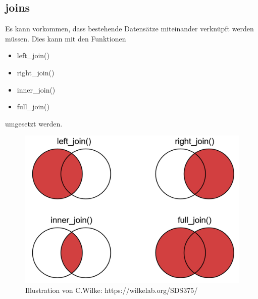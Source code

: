 \documentclass[
]{article}
\providecommand{\tightlist}{%
  \setlength{\itemsep}{0pt}\setlength{\parskip}{0pt}}
\begin{document}
\hypertarget{joins}{%
\subsection{joins}\label{joins}}

Es kann vorkommen, dass bestehende Datensätze miteinander verknüpft werden müssen. Dies kann mit den Funktionen

\begin{itemize}
\tightlist
\item
  left\_join()
\item
  right\_join()
\item
  inner\_join()
\item
  full\_join()
\end{itemize}

umgesetzt werden.

\begin{figure}

{\centering \includegraphics[width=1\linewidth]{images/044} 

}

\caption{Illustration von C.Wilke: https://wilkelab.org/SDS375/}\label{fig:unnamed-chunk-151}
\end{figure}
\end{document}
